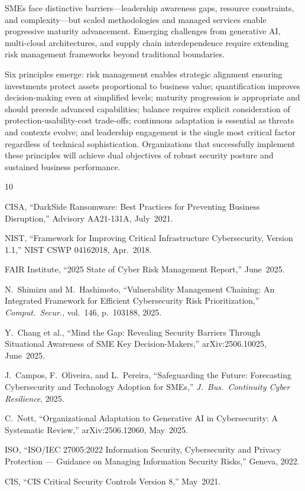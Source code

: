\documentclass[journal]{IEEEtran}
\begin{document}
SMEs face distinctive barriers---leadership awareness gaps, resource constraints, and
complexity---but scaled methodologies and managed services enable progressive maturity
advancement. Emerging challenges from generative AI, multi-cloud architectures, and
supply chain interdependence require extending risk management frameworks beyond
traditional boundaries.

Six principles emerge: risk management enables strategic alignment ensuring investments
protect assets proportional to business value; quantification improves decision-making
even at simplified levels; maturity progression is appropriate and should precede
advanced capabilities; balance requires explicit consideration of protection-usability-cost
trade-offs; continuous adaptation is essential as threats and contexts evolve; and
leadership engagement is the single most critical factor regardless of technical
sophistication. Organizations that successfully implement these principles will achieve
dual objectives of robust security posture and sustained business performance.


\begin{thebibliography}{10}

CISA, ``DarkSide Ransomware: Best Practices for Preventing Business Disruption,''
Advisory AA21-131A, July~2021.

NIST, ``Framework for Improving Critical Infrastructure Cybersecurity, Version 1.1,''
NIST CSWP 04162018, Apr.~2018.

FAIR Institute, ``2025 State of Cyber Risk Management Report,'' June~2025.

N.~Shimizu and M.~Hashimoto, ``Vulnerability Management Chaining: An Integrated
Framework for Efficient Cybersecurity Risk Prioritization,'' \textit{Comput.\ Secur.},
vol.~146, p.~103188, 2025.

Y.~Chang et al., ``Mind the Gap: Revealing Security Barriers Through Situational
Awareness of SME Key Decision-Makers,'' arXiv:2506.10025, June~2025.

J.~Campos, F.~Oliveira, and L.~Pereira, ``Safeguarding the Future: Forecasting
Cybersecurity and Technology Adoption for SMEs,'' \textit{J.\ Bus.\ Continuity Cyber
Resilience}, 2025.

C.~Nott, ``Organizational Adaptation to Generative AI in Cybersecurity: A Systematic
Review,'' arXiv:2506.12060, May~2025.

ISO, ``ISO/IEC 27005:2022 Information Security, Cybersecurity and Privacy
Protection --- Guidance on Managing Information Security Risks,'' Geneva, 2022.

CIS, ``CIS Critical Security Controls Version 8,'' May~2021.

\end{thebibliography}
\end{document}
